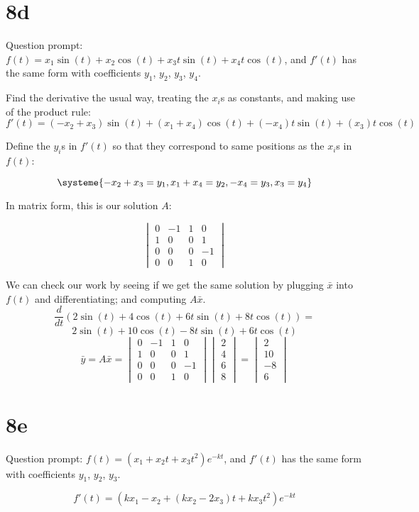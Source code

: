 \documentclass[12pt]{article}
\begin{document}
\section{8d}
Question prompt: $f(t) = x_1\sin(t) + x_2\cos(t) + x_3t\sin(t) + x_4t\cos(t)$,
and $f'(t)$ has the same form with coefficients $y_1$, $y_2$, $y_3$, $y_4$.

Find the derivative the usual way, treating the $x_i$s as constants, and making use of the product
rule: \\

\begin{equation}
f'(t) = (-x_2 + x_3)\sin(t) + (x_1 + x_4)\cos(t) + (-x_4)t\sin(t) + (x_3)t\cos(t)
\end{equation}

Define the $y_i$s in $f'(t)$ so that they correspond to same positions as the $x_i$s in $f(t)$:

\[
\systeme{-x_2 + x_3 = y_1, x_1 + x_4 = y_2, -x_4 = y_3,x_3 = y_4}
\]

In matrix form, this is our solution $A$:

\[
\begin{vmatrix}
  0 & -1 & 1 & 0 \\
  1 & 0 & 0 & 1 \\
  0 & 0 & 0 & -1 \\
  0 & 0 & 1 & 0 
\end{vmatrix}
\]

We can check our work by seeing if we get the same solution by plugging
$\bar{x}$ into $f(t)$ and differentiating; and computing $A\bar{x}$. 
\[
  \frac{d}{dt}(2\sin(t)+4\cos(t)+6t\sin(t)+8t\cos(t)) = 
\]
\[
  2\sin(t)+10\cos(t)-8t\sin(t)+6t\cos(t)
\]
\bigbreak{}
\[
  \bar{y} = A\bar{x} = 
  \begin{vmatrix}
    0 & -1 & 1 & 0 \\
    1 & 0 & 0 & 1 \\
    0 & 0 & 0 & -1 \\
    0 & 0 & 1 & 0 
    \end{vmatrix}
  \begin{vmatrix} 2 \\ 4 \\ 6 \\ 8\end{vmatrix} = 
  \begin{vmatrix} 2 \\ 10 \\ -8 \\ 6 \end{vmatrix}
\]

\section{8e}

Question prompt: $f(t) = (x_1 + x_2t + x_3t^2)e^{-kt}$, and $f'(t)$ has the same
form with coefficients $y_1$, $y_2$, $y_3$.

\[
  f'(t) = (kx_1 - x_2 + (kx_2-2x_3)t + kx_3t^2)e^{-kt}
\]
\end{document}
